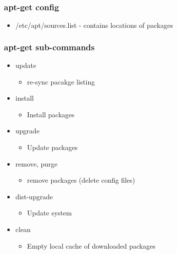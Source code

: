 \documentclass{report}
\begin{document}
    \bigbreak \noindent 
    \subsubsection{apt-get config}
    \bigbreak \noindent 
    \begin{itemize}
        \item /etc/apt/sources.list - contains locations of packages
    \end{itemize}

    \bigbreak \noindent 
    \subsubsection{apt-get sub-commands}
    \begin{itemize}
        \item update
            \begin{itemize}
                \item re-sync pacakge listing
            \end{itemize}
        \item install
            \begin{itemize}
                \item Install packages 
            \end{itemize}
        \item upgrade
            \begin{itemize}
                \item Update packages
            \end{itemize}
        \item remove, purge
            \begin{itemize}
                \item remove packages (delete config files)
            \end{itemize}
        \item dist-upgrade
            \begin{itemize}
                \item Update system
            \end{itemize}
        \item clean
            \begin{itemize}
                \item Empty local cache of downloaded packages
            \end{itemize}
    \end{itemize}
\end{document}
